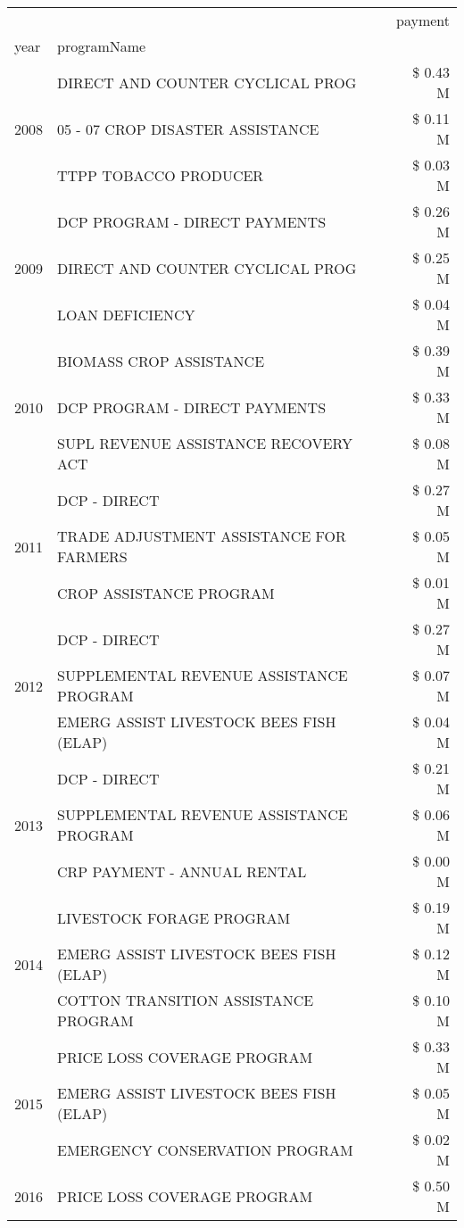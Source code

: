 \begin{tabular}{llr}
\toprule
 &  & payment \\
year & programName &  \\
\midrule
\multirow[t]{3}{*}{2008} & DIRECT AND COUNTER CYCLICAL PROG & \$ 0.43 M \\
 & 05 - 07 CROP DISASTER ASSISTANCE & \$ 0.11 M \\
 & TTPP TOBACCO PRODUCER & \$ 0.03 M \\
\cline{1-3}
\multirow[t]{3}{*}{2009} & DCP PROGRAM - DIRECT PAYMENTS & \$ 0.26 M \\
 & DIRECT AND COUNTER CYCLICAL PROG & \$ 0.25 M \\
 & LOAN DEFICIENCY & \$ 0.04 M \\
\cline{1-3}
\multirow[t]{3}{*}{2010} & BIOMASS CROP ASSISTANCE & \$ 0.39 M \\
 & DCP PROGRAM - DIRECT PAYMENTS & \$ 0.33 M \\
 & SUPL REVENUE ASSISTANCE RECOVERY ACT & \$ 0.08 M \\
\cline{1-3}
\multirow[t]{3}{*}{2011} & DCP - DIRECT & \$ 0.27 M \\
 & TRADE ADJUSTMENT ASSISTANCE FOR FARMERS & \$ 0.05 M \\
 & CROP ASSISTANCE PROGRAM & \$ 0.01 M \\
\cline{1-3}
\multirow[t]{3}{*}{2012} & DCP - DIRECT & \$ 0.27 M \\
 & SUPPLEMENTAL REVENUE ASSISTANCE PROGRAM & \$ 0.07 M \\
 & EMERG ASSIST LIVESTOCK BEES FISH (ELAP) & \$ 0.04 M \\
\cline{1-3}
\multirow[t]{3}{*}{2013} & DCP - DIRECT & \$ 0.21 M \\
 & SUPPLEMENTAL REVENUE ASSISTANCE PROGRAM & \$ 0.06 M \\
 & CRP PAYMENT - ANNUAL RENTAL & \$ 0.00 M \\
\cline{1-3}
\multirow[t]{3}{*}{2014} & LIVESTOCK FORAGE PROGRAM & \$ 0.19 M \\
 & EMERG ASSIST LIVESTOCK BEES FISH (ELAP) & \$ 0.12 M \\
 & COTTON TRANSITION ASSISTANCE PROGRAM & \$ 0.10 M \\
\cline{1-3}
\multirow[t]{3}{*}{2015} & PRICE LOSS COVERAGE PROGRAM & \$ 0.33 M \\
 & EMERG ASSIST LIVESTOCK BEES FISH (ELAP) & \$ 0.05 M \\
 & EMERGENCY CONSERVATION PROGRAM & \$ 0.02 M \\
\cline{1-3}
\multirow[t]{3}{*}{2016} & PRICE LOSS COVERAGE PROGRAM                   & \$ 0.50 M \\

\end{tabular}

